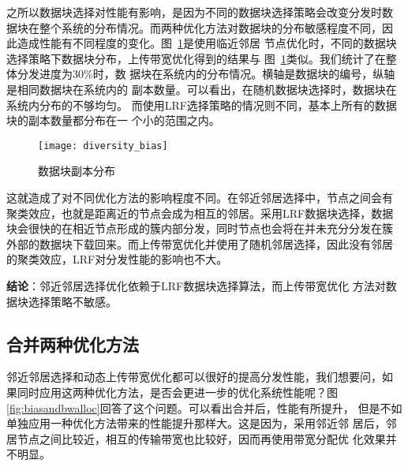 之所以数据块选择对性能有影响，是因为不同的数据块选择策略会改变分发时数
据块在整个系统的分布情况。而两种优化方法对数据块的分布敏感程度不同，因
此造成性能有不同程度的变化。图~\ref{fig:diversity_bias}是使用临近邻居
节点优化时，不同的数据块选择策略下数据块分布，上传带宽优化得到的结果与
图~\ref{fig:diversity_bias}类似。我们统计了在整体分发进度为30\%时，数
据块在系统内的分布情况。横轴是数据块的编号，纵轴是相同数据块在系统内的
副本数量。可以看出，在随机数据块选择时，数据块在系统内分布的不够均匀。
而使用LRF选择策略的情况则不同，基本上所有的数据块的副本数量都分布在一
个小的范围之内。

\begin{figure}
  \centering
  \begin{minipage}{0.6\linewidth}
    \centering
    \texttt{[image: diversity\_bias]}
    \caption{数据块副本分布}
    \label{fig:diversity_bias}
  \end{minipage}
\end{figure}


这就造成了对不同优化方法的影响程度不同。在邻近邻居选择中，节点之间会有
聚类效应，也就是距离近的节点会成为相互的邻居。采用LRF数据块选择，数据
块会很快的在相近节点形成的簇内部分发，同时节点也会将在并未充分分发在簇
外部的数据块下载回来。而上传带宽优化并使用了随机邻居选择，因此没有邻居
的聚类效应，LRF对分发性能的影响也不大。


\textbf{结论}：邻近邻居选择优化依赖于LRF数据块选择算法，而上传带宽优化
方法对数据块选择策略不敏感。


\subsection{合并两种优化方法}

邻近邻居选择和动态上传带宽优化都可以很好的提高分发性能，我们想要问，如
果同时应用这两种优化方法，是否会更进一步的优化系统性能呢？图~
\ref{fig:biasandbwalloc}回答了这个问题。可以看出合并后，性能有所提升，
但是不如单独应用一种优化方法带来的性能提升那样大。这是因为，采用邻近邻
居后，邻居节点之间比较近，相互的传输带宽也比较好，因而再使用带宽分配优
化效果并不明显。


